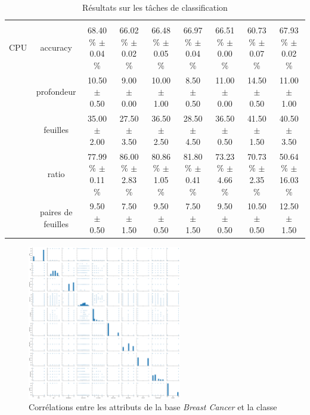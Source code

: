 \documentclass[a4paper]{article}
\begin{document}
\begin{table}
{\begin{tabular}{|*{9}{c|}}
    
    & & & & & & & & \\
    
    CPU & accuracy  & 68.40 \% $\pm$ 0.04 \% & 66.02 \% $\pm$ 0.02 \% & 66.48 \% $\pm$ 0.05 \% & 66.97 \% $\pm$ 0.04 \% & 66.51 \% $\pm$ 0.00 \% & 60.73 \% $\pm$ 0.07 \% & 67.93 \% $\pm$ 0.02 \% \\

& profondeur  & 10.50 $\pm$ 0.50& 9.00 $\pm$ 0.00& 10.00 $\pm$ 1.00& 8.50 $\pm$ 0.50& 11.00 $\pm$ 0.00& 14.50 $\pm$ 0.50& 11.00 $\pm$ 1.00 \\

    & feuilles  & 35.00 $\pm$ 2.00& 27.50 $\pm$ 3.50& 36.50 $\pm$ 2.50& 28.50 $\pm$ 4.50& 36.50 $\pm$ 0.50& 41.50 $\pm$ 1.50& 40.50 $\pm$ 3.50 \\

    & ratio  & 77.99 \% $\pm$ 0.11 \%& 86.00 \% $\pm$ 2.83 \%& 80.86 \% $\pm$ 1.05 \%& 81.80 \% $\pm$ 0.41 \%& 73.23 \% $\pm$ 4.66 \%& 70.73 \% $\pm$ 2.35 \%& 50.64 \% $\pm$ 16.03 \% \\

    & paires de feuilles  & 9.50 $\pm$ 0.50& 7.50 $\pm$ 1.50& 9.50 $\pm$ 0.50& 7.50 $\pm$ 1.50& 9.50 $\pm$ 0.50& 10.50 $\pm$ 0.50& 12.50 $\pm$ 1.50 \\

\hline
\end{tabular}}
\caption{Résultats sur les tâches de classification}
\label{tab:resultats-classification}
\end{table}

\begin{figure}[H]
	\center 
	\includegraphics[width=0.6\textwidth]{images/breast-cancer.png}
    \caption{Corrélations entre les attributs de la base \emph{Breast Cancer}
    et la classe}
    \label{img:breast-cancer}
\end{figure}
\end{document}
